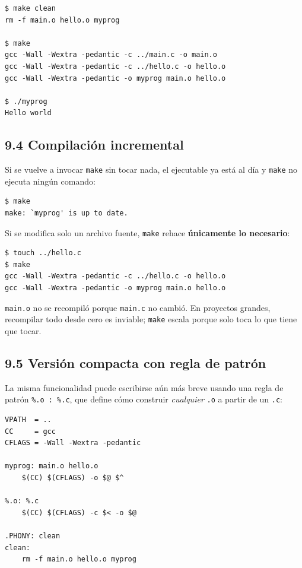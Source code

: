 \documentclass[11pt,a4paper]{article}
\begin{document}
\begin{lstlisting}[style=outstyle]
$ make clean
rm -f main.o hello.o myprog

$ make
gcc -Wall -Wextra -pedantic -c ../main.c -o main.o
gcc -Wall -Wextra -pedantic -c ../hello.c -o hello.o
gcc -Wall -Wextra -pedantic -o myprog main.o hello.o

$ ./myprog
Hello world
\end{lstlisting}

\subsection*{9.4 Compilación incremental}

Si se vuelve a invocar \texttt{make} sin tocar nada, el ejecutable ya
está al día y \texttt{make} no ejecuta ningún comando:

\begin{lstlisting}[style=outstyle]
$ make
make: `myprog' is up to date.
\end{lstlisting}

Si se modifica solo un archivo fuente, \texttt{make} rehace
\textbf{únicamente lo necesario}:

\begin{lstlisting}[style=outstyle]
$ touch ../hello.c
$ make
gcc -Wall -Wextra -pedantic -c ../hello.c -o hello.o
gcc -Wall -Wextra -pedantic -o myprog main.o hello.o
\end{lstlisting}

\texttt{main.o} no se recompiló porque \texttt{main.c} no cambió. En
proyectos grandes, recompilar todo desde cero es inviable;
\texttt{make} escala porque solo toca lo que tiene que tocar.

\subsection*{9.5 Versión compacta con regla de patrón}

La misma funcionalidad puede escribirse aún más breve usando una regla
de patrón \texttt{\%.o : \%.c}, que define cómo construir
\emph{cualquier} \texttt{.o} a partir de un \texttt{.c}:

\begin{lstlisting}[style=asmstyle]
VPATH  = ..
CC     = gcc
CFLAGS = -Wall -Wextra -pedantic

myprog: main.o hello.o
	$(CC) $(CFLAGS) -o $@ $^

%.o: %.c
	$(CC) $(CFLAGS) -c $< -o $@

.PHONY: clean
clean:
	rm -f main.o hello.o myprog
\end{lstlisting}
\end{document}
